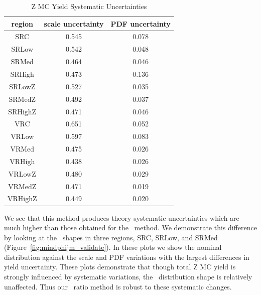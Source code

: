 \begin{table}[htbp]
\caption{Z MC Yield Systematic Uncertainties}
\begin{center}
\begin{tabular}{c|c|c}
region & scale uncertainty & PDF uncertainty \\
\hline
SRC & 0.545 & 0.078 \\
SRLow & 0.542 & 0.048 \\
SRMed & 0.464 & 0.046 \\
SRHigh & 0.473 & 0.136 \\
SRLowZ & 0.527 & 0.035 \\
SRMedZ & 0.492 & 0.037 \\
SRHighZ & 0.471 & 0.046 \\
VRC & 0.651 & 0.052 \\
VRLow & 0.597 & 0.083 \\
VRMed & 0.475 & 0.026 \\
VRHigh & 0.438 & 0.026 \\
VRLowZ & 0.480 & 0.029 \\
VRMedZ & 0.471 & 0.019 \\
VRHighZ & 0.449 & 0.020 \\
\end{tabular}
\end{center}
\label{tab:ZMC_yield_systematics} 
\end{table}

We see that this method produces theory systematic uncertainties which are much higher than those obtained for the \mindphijm\ method. We demonstrate this difference by looking at the \mindphijm\ shapes in three regions, SRC, SRLow, and SRMed (Figure~\ref{fig:mindphijm_validate}). In these plots we show the nominal \mindphijm distribution against the scale and PDF variations with the largest differences in yield uncertainty. These plots demonstrate that though total Z MC yield is strongly influenced by systematic variations, the \mindphijm\ distribution shape is relatively unaffected. Thus our \mindphijm\ ratio method is robust to these systematic changes.

